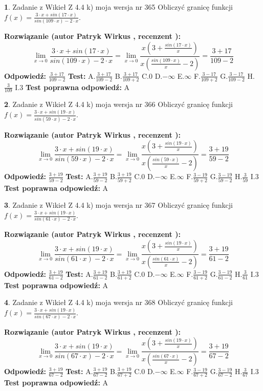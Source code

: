 \documentclass[12pt, a4paper]{article}
\theoremstyle{definition} %
\newtheorem{zad}{}
\newcommand{\zadStart}[1]{\begin{zad}#1\newline}
\newcommand{\zadStop}{\end{zad}}
\newcommand{\rozwStart}[2]{\noindent \textbf{Rozwiązanie (autor #1 , recenzent #2): }\newline}
\newcommand{\rozwStop}{\newline}
\newcommand{\odpStart}{\noindent \textbf{Odpowiedź:}\newline}
\newcommand{\odpStop}{\newline}
\newcommand{\testStart}{\noindent \textbf{Test:}\newline}
\newcommand{\testStop}{\newline}
\newcommand{\kluczStart}{\noindent \textbf{Test poprawna odpowiedź:}\newline}
\newcommand{\kluczStop}{\newline}
\begin{document}
\zadStart{Zadanie z Wikieł Z 4.4 k) moja wersja nr 365}
Obliczyć granicę funkcji $f(x)=\frac{3\cdot x +sin(17\cdot x)}{sin(109\cdot x) -2\cdot x}$.
\zadStop
\rozwStart{Patryk Wirkus}{}
$$\lim\limits_{x\to 0}\frac{3\cdot x +sin(17\cdot x)}{sin(109\cdot x) -2\cdot x}
=\lim\limits_{x\to 0}\frac{x(3+\frac{sin(17\cdot x)}{x})}{x(\frac{sin(109\cdot x)}{x}-2)}
=\frac{3+17}{109-2}$$
\rozwStop
\odpStart
$\frac{3+17}{109-2}$
\odpStop
\testStart
A.$\frac{3+17}{109-2}$
B.$\frac{3+17}{109+2}$
C.$0$
D.$-\infty$
E.$\infty$
F.$\frac{3-17}{109+2}$
G.$\frac{3-17}{109-2}$
H.$\frac{3}{109}$
I.$3$
\testStop
\kluczStart
A
\kluczStop



\zadStart{Zadanie z Wikieł Z 4.4 k) moja wersja nr 366}
Obliczyć granicę funkcji $f(x)=\frac{3\cdot x +sin(19\cdot x)}{sin(59\cdot x) -2\cdot x}$.
\zadStop
\rozwStart{Patryk Wirkus}{}
$$\lim\limits_{x\to 0}\frac{3\cdot x +sin(19\cdot x)}{sin(59\cdot x) -2\cdot x}
=\lim\limits_{x\to 0}\frac{x(3+\frac{sin(19\cdot x)}{x})}{x(\frac{sin(59\cdot x)}{x}-2)}
=\frac{3+19}{59-2}$$
\rozwStop
\odpStart
$\frac{3+19}{59-2}$
\odpStop
\testStart
A.$\frac{3+19}{59-2}$
B.$\frac{3+19}{59+2}$
C.$0$
D.$-\infty$
E.$\infty$
F.$\frac{3-19}{59+2}$
G.$\frac{3-19}{59-2}$
H.$\frac{3}{59}$
I.$3$
\testStop
\kluczStart
A
\kluczStop



\zadStart{Zadanie z Wikieł Z 4.4 k) moja wersja nr 367}
Obliczyć granicę funkcji $f(x)=\frac{3\cdot x +sin(19\cdot x)}{sin(61\cdot x) -2\cdot x}$.
\zadStop
\rozwStart{Patryk Wirkus}{}
$$\lim\limits_{x\to 0}\frac{3\cdot x +sin(19\cdot x)}{sin(61\cdot x) -2\cdot x}
=\lim\limits_{x\to 0}\frac{x(3+\frac{sin(19\cdot x)}{x})}{x(\frac{sin(61\cdot x)}{x}-2)}
=\frac{3+19}{61-2}$$
\rozwStop
\odpStart
$\frac{3+19}{61-2}$
\odpStop
\testStart
A.$\frac{3+19}{61-2}$
B.$\frac{3+19}{61+2}$
C.$0$
D.$-\infty$
E.$\infty$
F.$\frac{3-19}{61+2}$
G.$\frac{3-19}{61-2}$
H.$\frac{3}{61}$
I.$3$
\testStop
\kluczStart
A
\kluczStop



\zadStart{Zadanie z Wikieł Z 4.4 k) moja wersja nr 368}
Obliczyć granicę funkcji $f(x)=\frac{3\cdot x +sin(19\cdot x)}{sin(67\cdot x) -2\cdot x}$.
\zadStop
\rozwStart{Patryk Wirkus}{}
$$\lim\limits_{x\to 0}\frac{3\cdot x +sin(19\cdot x)}{sin(67\cdot x) -2\cdot x}
=\lim\limits_{x\to 0}\frac{x(3+\frac{sin(19\cdot x)}{x})}{x(\frac{sin(67\cdot x)}{x}-2)}
=\frac{3+19}{67-2}$$
\rozwStop
\odpStart
$\frac{3+19}{67-2}$
\odpStop
\testStart
A.$\frac{3+19}{67-2}$
B.$\frac{3+19}{67+2}$
C.$0$
D.$-\infty$
E.$\infty$
F.$\frac{3-19}{67+2}$
G.$\frac{3-19}{67-2}$
H.$\frac{3}{67}$
I.$3$
\testStop
\kluczStart
A
\kluczStop
\end{document}
